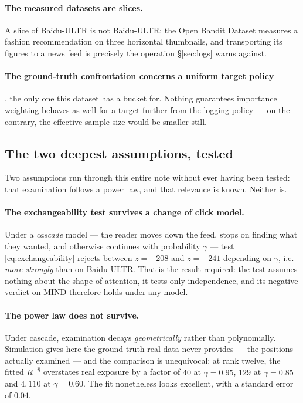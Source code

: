 \documentclass[11pt,a4paper]{article}
\begin{document}
\paragraph{The measured datasets are slices.} A slice of Baidu-ULTR is not Baidu-ULTR; the Open
Bandit Dataset measures a fashion recommendation on three horizontal thumbnails, and
transporting its figures to a news feed is precisely the operation \S\ref{sec:logs} warns
against.

\paragraph{The ground-truth confrontation concerns a uniform target policy}, the only one this
dataset has a bucket for. Nothing guarantees importance weighting behaves as well for a target
further from the logging policy --- on the contrary, the effective sample size would be smaller
still.



\subsection{The two deepest assumptions, tested}
\label{sec:blindspots}

Two assumptions run through this entire note without ever having been tested: that examination
follows a power law, and that relevance is known. Neither is.

\paragraph{The exchangeability test survives a change of click model.} Under a \emph{cascade}
model \citep{craswell2008} --- the reader moves down the feed, stops on finding what they wanted, and otherwise
continues with probability $\gamma$ --- test \eqref{eq:exchangeability} rejects between $z = -208$
and $z = -241$ depending on $\gamma$, i.e. \emph{more strongly} than on Baidu-ULTR. That is the
result required: the test assumes nothing about the shape of attention, it tests only
independence, and its negative verdict on MIND therefore holds under any model.

\paragraph{The power law does not survive.} Under cascade, examination decays \emph{geometrically}
rather than polynomially. Simulation gives here the ground truth real data never provides --- the
positions actually examined --- and the comparison is unequivocal: at rank twelve, the fitted
$R^{-\hat\eta}$ overstates real exposure by a factor of $40$ at $\gamma = 0.95$, $129$ at
$\gamma = 0.85$ and $4{,}110$ at $\gamma = 0.60$. The fit nonetheless looks excellent, with a
standard error of $0.04$.
\end{document}
